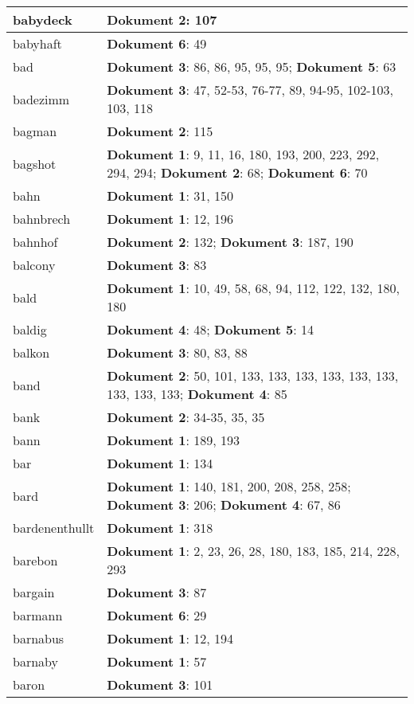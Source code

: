 \documentclass[a5paper]{article}
\begin{document}
\begin{longtable}[l]{|l|p{3in}|}
\hline
babydeck & \textbf{Dokument 2}: 107 \\
\hline
babyhaft & \textbf{Dokument 6}: 49 \\
\hline
bad & \textbf{Dokument 3}: 86, 86, 95, 95, 95; \textbf{Dokument 5}: 63 \\
\hline
badezimm & \textbf{Dokument 3}: 47, 52-53, 76-77, 89, 94-95, 102-103, 103, 118 \\
\hline
bagman & \textbf{Dokument 2}: 115 \\
\hline
bagshot & \textbf{Dokument 1}: 9, 11, 16, 180, 193, 200, 223, 292, 294, 294; \textbf{Dokument 2}: 68; \textbf{Dokument 6}: 70 \\
\hline
bahn & \textbf{Dokument 1}: 31, 150 \\
\hline
bahnbrech & \textbf{Dokument 1}: 12, 196 \\
\hline
bahnhof & \textbf{Dokument 2}: 132; \textbf{Dokument 3}: 187, 190 \\
\hline
balcony & \textbf{Dokument 3}: 83 \\
\hline
bald & \textbf{Dokument 1}: 10, 49, 58, 68, 94, 112, 122, 132, 180, 180 \\
\hline
baldig & \textbf{Dokument 4}: 48; \textbf{Dokument 5}: 14 \\
\hline
balkon & \textbf{Dokument 3}: 80, 83, 88 \\
\hline
band & \textbf{Dokument 2}: 50, 101, 133, 133, 133, 133, 133, 133, 133, 133, 133; \textbf{Dokument 4}: 85 \\
\hline
bank & \textbf{Dokument 2}: 34-35, 35, 35 \\
\hline
bann & \textbf{Dokument 1}: 189, 193 \\
\hline
bar & \textbf{Dokument 1}: 134 \\
\hline
bard & \textbf{Dokument 1}: 140, 181, 200, 208, 258, 258; \textbf{Dokument 3}: 206; \textbf{Dokument 4}: 67, 86 \\
\hline
bardenenthullt & \textbf{Dokument 1}: 318 \\
\hline
barebon & \textbf{Dokument 1}: 2, 23, 26, 28, 180, 183, 185, 214, 228, 293 \\
\hline
bargain & \textbf{Dokument 3}: 87 \\
\hline
barmann & \textbf{Dokument 6}: 29 \\
\hline
barnabus & \textbf{Dokument 1}: 12, 194 \\
\hline
barnaby & \textbf{Dokument 1}: 57 \\
\hline
baron & \textbf{Dokument 3}: 101 \\
\hline

\end{longtable}
\end{document}
